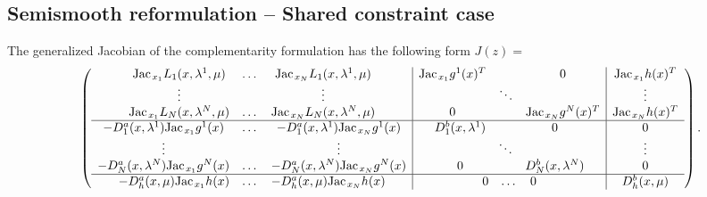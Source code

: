 \documentclass[11pt]{article}
\newcommand{\Jac}{\textrm{Jac\hskip+.1em}}
\begin{document}
\subsection{Semismooth reformulation -- Shared constraint case\label{app:nseq:jointcase}}

The generalized Jacobian of the complementarity formulation has the following form $J(z) =$
$$
\left(
\begin{array}{c|c|c}
	\begin{matrix}
	\Jac_{x_1} L_1(x, \lambda^1, \mu)  & \dots & \Jac_{x_N} L_1(x, \lambda^1, \mu)  \\
	\vdots & & \vdots \\
	\Jac_{x_1} L_N(x, \lambda^N, \mu)  & \dots & \Jac_{x_N} L_N(x, \lambda^N, \mu)  \\
	\end{matrix}
&
	\begin{matrix}
	\Jac_{x_1} g^1(x)^T & & 0 \\
	& \ddots & \\
	0 & & \Jac_{x_N} g^N(x)^T \\
	\end{matrix}	
&
	\begin{matrix}
	\Jac_{x_1} h(x)^T \\
	\vdots \\
	\Jac_{x_N} h(x)^T \\
	\end{matrix}	
\\
\hline 
	\begin{matrix}	
	- D_1^a(x, \lambda^1) \Jac_{x_1} g^1(x) & \dots & - D_1^a(x, \lambda^1) \Jac_{x_N} g^1(x) \\
	\vdots & & \vdots \\
	- D_N^a(x, \lambda^N) \Jac_{x_1} g^N(x) & \dots & - D_N^a(x, \lambda^N) \Jac_{x_N} g^N(x) \\
	\end{matrix}		
&
	\begin{matrix}	
	 D^b_{1}(x, \lambda^1) & & 0 \\
	 & \ddots &  \\
	0  &  &  D^b_{N}(x, \lambda^N) \\
	\end{matrix}			
&
	\begin{matrix}	
	 0 \\
	\vdots  \\
	0  \\
	\end{matrix}			
\\
\hline 
	\begin{matrix}	
	- D_h^a(x, \mu) \Jac_{x_1} h(x) & \dots & - D_h^a(x, \mu) \Jac_{x_N} h(x) \\
	\end{matrix}		
&
	\begin{matrix}	
	0  & \dots &  0 \\
	\end{matrix}			
&
	\begin{matrix}	
	D^b_{h}(x, \mu) \\
	\end{matrix}			
\end{array}	
\right) .
$$
\end{document}
